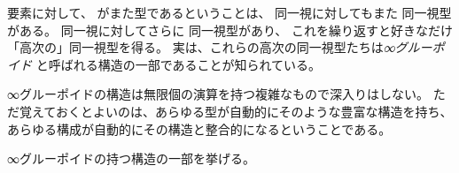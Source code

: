 \documentclass[index]{subfiles}
\begin{document}

要素に対して、
がまた型であるということは、
同一視に対してもまた
同一視型がある。
同一視に対してさらに
同一視型があり、
これを繰り返すと好きなだけ「高次の」同一視型を得る。
実は、これらの高次の同一視型たちは\emph{∞グルーポイド}
と呼ばれる構造の一部であることが知られている。

∞グルーポイドの構造は無限個の演算を持つ複雑なもので深入りはしない。
ただ覚えておくとよいのは、あらゆる型が自動的にそのような豊富な構造を持ち、
あらゆる構成が自動的にその構造と整合的になるということである。

∞グルーポイドの持つ構造の一部を挙げる。



\end{document}
